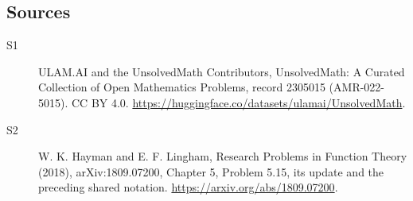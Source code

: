 \documentclass[11pt]{article}
\begin{document}
\subsection{Sources}
\begin{description}
\item[\hypertarget{source:2305015:1}{S1}] ULAM.AI and the UnsolvedMath Contributors, UnsolvedMath: A Curated Collection of Open Mathematics Problems, record 2305015 (AMR-022-5015). CC BY 4.0. \url{https://huggingface.co/datasets/ulamai/UnsolvedMath}.
\item[\hypertarget{source:2305015:2}{S2}] W. K. Hayman and E. F. Lingham, Research Problems in Function Theory (2018), arXiv:1809.07200, Chapter 5, Problem 5.15, its update and the preceding shared notation. \url{https://arxiv.org/abs/1809.07200}.
\end{description}
\label{end:2305015}
\end{document}
